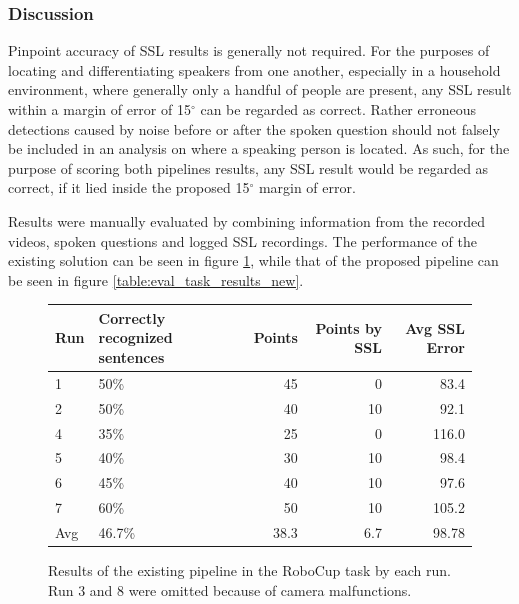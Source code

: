 \subsubsection{Discussion}
Pinpoint accuracy of SSL results is generally not required.
For the purposes of locating and differentiating speakers from one another, especially in a household environment, where generally only a handful of people are present, any SSL result within a margin of error of 15$^\circ$ can be regarded as correct.
Rather erroneous detections caused by noise before or after the spoken question should not falsely be included in an analysis on where a speaking person is located.
As such, for the purpose of scoring both pipelines results, any SSL result would be regarded as correct, if it lied inside the proposed 15$^\circ$ margin of error.

Results were manually evaluated by combining information from the recorded videos, spoken questions and logged SSL recordings.
The performance of the existing solution can be seen in figure \ref{table:eval_task_results_old}, while that of the proposed pipeline can be seen in figure \ref{table:eval_task_results_new}.

\begin{figure}[]
	\begin{tabular}{ | l | p{3.5cm} | r | r | r |}
		\hline
		Run & Correctly recognized sentences & Points & Points by SSL & Avg SSL Error \\ \hline
		1 & 50\% & 45 & 0 & 83.4\\ \hline
		2 & 50\% & 40 & 10 & 92.1\\ \hline
		4 & 35\% & 25 &  0 & 116.0\\ \hline
		5 & 40\% & 30 & 10 & 98.4\\ \hline
		6 & 45\% & 40 & 10 & 97.6\\ \hline
		7 & 60\% & 50 & 10 & 105.2\\ \hhline{|=|=|=|=|=|}
		Avg & 46.7\% & 38.3 & 6.7 & 98.78 \\
		\hline
	\end{tabular}
	\caption{Results of the existing pipeline in the RoboCup task by each run.
		Run 3 and 8 were omitted because of camera malfunctions.}
	\label{table:eval_task_results_old}
\end{figure}

